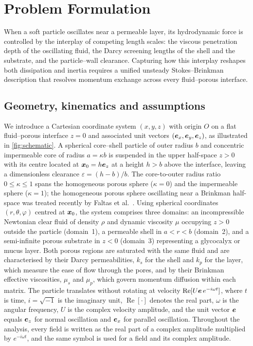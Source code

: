 \section{Problem Formulation}\label{sec:formulation}

When a soft particle oscillates near a permeable layer, its hydrodynamic force is controlled by the interplay of
competing length scales: the viscous penetration depth of the oscillating fluid, the Darcy screening lengths of the
shell and the substrate, and the particle--wall clearance. Capturing how this interplay reshapes both dissipation and
inertia requires a unified unsteady Stokes--Brinkman description that resolves momentum exchange across every
fluid--porous interface.

\subsection{Geometry, kinematics and assumptions}\label{sec:geometry}
We introduce a Cartesian coordinate system $(x,y,z)$ with origin $O$ on a flat fluid--porous interface $z=0$ and
associated unit vectors $(\bm{e}_x,\bm{e}_y,\bm{e}_z)$, as illustrated in \cref{fig:schematic}. A spherical core--shell particle of
outer radius $b$ and concentric impermeable core of radius $a=\kappa b$ is suspended in the upper half-space $z>0$ with
its centre located at $\bm{x}_0=h\bm{e}_z$ at a height $h>b$ above the interface, leaving a dimensionless clearance
$\varepsilon=(h-b)/b$. The core-to-outer radius ratio $0\le\kappa\le1$ spans the homogeneous porous sphere ($\kappa=0$)
and the impermeable sphere ($\kappa=1$); the homogeneous porous sphere oscillating near a Brinkman half-space was treated
recently by Faltas et al.~\cite{faltas2026rectilinear}. Using spherical coordinates $(r,\theta,\varphi)$ centred at $\bm{x}_0$, the system
comprises three domains: an incompressible Newtonian clear fluid of density $\rho$ and dynamic viscosity $\mu$ occupying
$z>0$ outside the particle (domain~1), a permeable shell in $a<r<b$ (domain~2), and a semi-infinite porous substrate in
$z<0$ (domain~3) representing a glycocalyx or mucus layer. Both porous regions are saturated with the same fluid and are
characterised by their Darcy permeabilities, $k_s$ for the shell and $k_p$ for the layer, which measure the ease of flow
through the pores, and by their Brinkman effective viscosities, $\mu_s$ and $\mu_p$, which govern momentum diffusion
within each matrix. The particle translates without rotating at velocity $\operatorname{Re}[U\bm{e}\,e^{-i\omega t}]$, where
$t$ is time, $i=\sqrt{-1}$ is the imaginary unit, $\operatorname{Re}[\cdot]$ denotes the real part, $\omega$ is the
angular frequency, $U$ is the complex velocity amplitude, and the unit vector $\bm{e}$ equals $\bm{e}_z$ for normal oscillation
and $\bm{e}_x$ for parallel oscillation. Throughout the analysis, every field is written as the real part of a complex
amplitude multiplied by $e^{-i\omega t}$, and the same symbol is used for a field and its complex amplitude.

